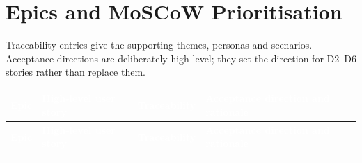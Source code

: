 \documentclass[12pt, a4paper]{article}
\begin{document}
\section{Epics and MoSCoW Prioritisation}
Traceability entries give the supporting themes, personas and scenarios. Acceptance directions are deliberately high level; they set the direction for D2--D6 stories rather than replace them.

{\footnotesize
\setlength{\tabcolsep}{4pt}
\begin{longtable}{|>{\raggedright\arraybackslash}p{2.6cm}|>{\raggedright\arraybackslash}p{5.1cm}|>{\raggedright\arraybackslash}p{3.0cm}|>{\raggedright\arraybackslash}p{4.9cm}|}
\hline
\rowcolor{cNavy}
\textcolor{white}{\textbf{Epic}} & \textcolor{white}{\textbf{High-level user story}} & \textcolor{white}{\textbf{Traceability}} & \textcolor{white}{\textbf{Acceptance direction and rationale}} \\
\hline
\endfirsthead
\hline
\rowcolor{cNavy}
\textcolor{white}{\textbf{Epic}} & \textcolor{white}{\textbf{High-level user story}} & \textcolor{white}{\textbf{Traceability}} & \textcolor{white}{\textbf{Acceptance direction and rationale}} \\
\hline
\endhead
\hline
\endfoot


\end{longtable}}
\end{document}
